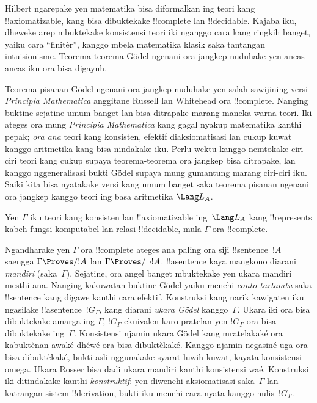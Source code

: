 \documentclass[../../../include/open-logic-section]{subfiles}
\begin{document}


Hilbert ngarepake yen matematika bisa diformalkan
ing teori kang !!{axiomatizable}, kang bisa
dibuktekake !!{complete} lan !!{decidable}.
Kajaba iku, dheweke arep mbuktekake konsistensi
teori iki nganggo cara kang ringkih banget,
yaiku cara ``finitèr'', kanggo mbela matematika
klasik saka tantangan intuisionisme. Teorema-teorema
G\"odel ngenani ora jangkep nuduhake yen
ancas-ancas iku ora bisa digayuh.

Teorema pisanan G\"odel ngenani ora jangkep
nuduhake yen salah sawijining versi
\emph{Principia Mathematica} anggitane Russell
lan Whitehead ora !!{complete}. Nanging buktine
sejatine umum banget lan bisa ditrapake marang
maneka warna teori. Iki ateges ora mung
\emph{Principia Mathematica} kang gagal nyakup
matematika kanthi pepak; \emph{ora ana} teori
kang konsisten, efektif diaksiomatisasi lan cukup
kuwat kanggo aritmetika kang bisa nindakake iku.
Perlu wektu kanggo nemtokake ciri-ciri teori
kang cukup supaya teorema-teorema ora jangkep
bisa ditrapake, lan kanggo nggeneralisasi bukti
G\"odel supaya mung gumantung marang ciri-ciri
iku. Saiki kita bisa nyatakake versi kang umum
banget saka teorema pisanan ngenani ora jangkep
kanggo teori ing basa aritmetika $\Lang L_A$.

\begin{thm}
Yen $\Gamma$ iku teori kang konsisten lan
!!{axiomatizable} ing~$\Lang L_A$ kang
!!{represents} kabeh fungsi komputabel lan
relasi !!{decidable}, mula $\Gamma$
ora !!{complete}.
\end{thm}

Ngandharake yen $\Gamma$ ora !!{complete} ateges
ana paling ora siji !!{sentence}~$!A$ saengga
$\Gamma \Proves/ !A$ lan $\Gamma \Proves/ \lnot
!A$. !!a{sentence} kaya mangkono diarani
\emph{mandiri} (saka~$\Gamma$).
Sejatine, ora angel banget mbuktekake yen ukara
mandiri mesthi ana. Nanging kakuwatan buktine
G\"odel yaiku menehi \emph{conto tartamtu}
saka !!{sentence} kang digawe kanthi cara efektif.
Konstruksi kang narik kawigaten iku ngasilake
!!a{sentence}~$!G_\Gamma$, kang diarani
\emph{ukara G\"odel} kanggo~$\Gamma$.
Ukara iki ora bisa dibuktekake amarga ing
$\Gamma$, $!G_\Gamma$ ekuivalen karo pratelan
yen $!G_\Gamma$ ora bisa dibuktekake ing~$\Gamma$. Konsistensi njamin ukara Gödel kang mratelakaké ora kabuktènan awaké dhéwé ora bisa dibuktèkaké. Kanggo njamin negasiné uga ora bisa dibuktèkaké, bukti asli nggunakake syarat luwih kuwat, kayata konsistensi omega. Ukara Rosser bisa dadi ukara mandiri kanthi konsistensi waé.
Konstruksi iki ditindakake kanthi
\emph{konstruktif}: yen diwenehi aksiomatisasi
saka~$\Gamma$ lan katrangan sistem
!!{derivation}, bukti iku menehi cara nyata
kanggo nulis~$!G_\Gamma$.
\end{document}
